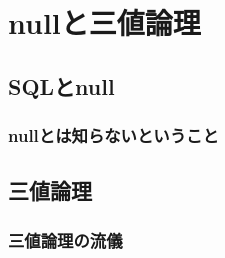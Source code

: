 \chapter{nullと三値論理}

\section{SQLとnull}

\subsection{nullとは知らないということ}

\section{三値論理}

\subsection{三値論理の流儀}